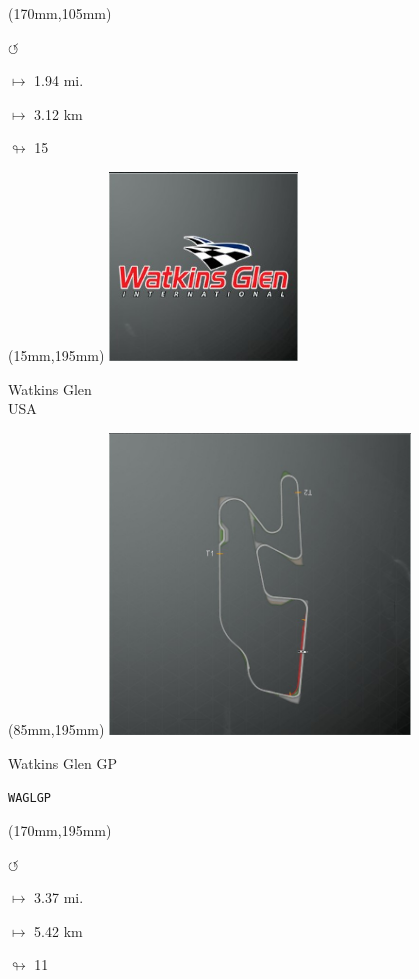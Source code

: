 \begin{textblock*}{30mm}(170mm,105mm)%
\par \Huge$\circlearrowleft$
\Large
\par$\mapsto$ 1.94 mi.
\par$\mapsto$ 3.12 km
\par$\looparrowright$ 15
\end{textblock*}
\begin{textblock*}{60mm}(15mm,195mm)%
\includegraphics[width=50mm]{LG/2015-05-20_00097.png}
\par Watkins Glen\\ USA
\end{textblock*}
\begin{textblock*}{80mm}(85mm,195mm)%
\includegraphics[width=80mm]{TR/2015-05-20_00066.png}
\centerline{Watkins Glen GP}
\par\hfill\tiny\tt WAGLGP\\
\end{textblock*}
\begin{textblock*}{30mm}(170mm,195mm)%
\par \Huge$\circlearrowleft$
\Large
\par$\mapsto$ 3.37 mi.
\par$\mapsto$ 5.42 km
\par$\looparrowright$ 11
\end{textblock*}
\null\newpage

